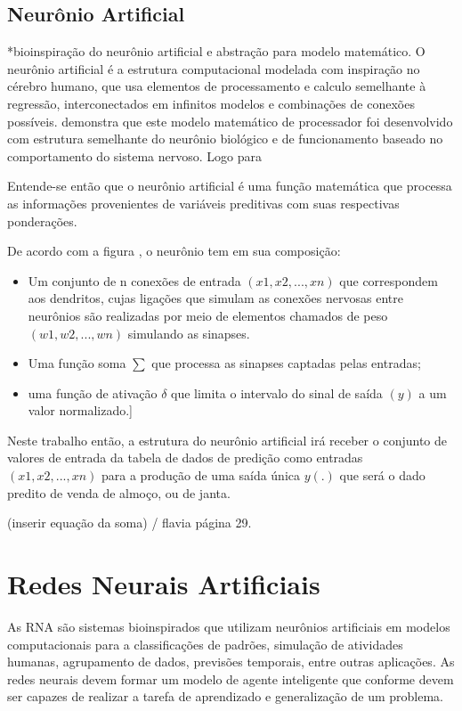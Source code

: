 \documentclass[	12pt, Times, openright, twoside, a4paper, english, brazil]{abntex2}
\begin{document}
\subsection{Neurônio Artificial}
*bioinspiração do neurônio artificial e abstração para modelo matemático.
O neurônio artificial é a estrutura computacional modelada com inspiração no cérebro humano, que usa elementos de processamento  e calculo semelhante à regressão, interconectados em infinitos modelos e combinações de conexões possíveis.
\cite{Haykin1994} demonstra que este modelo matemático de processador foi desenvolvido com estrutura semelhante do neurônio biológico e de funcionamento baseado no comportamento do sistema nervoso.
Logo para 

Entende-se então que o neurônio artificial é uma função matemática que processa as informações provenientes de variáveis preditivas com suas respectivas ponderações. 

De acordo com a figura , o neurônio tem em sua composição: 
\begin{itemize}
\item  Um conjunto de n conexões de entrada $ (x1,x2,...,xn)$ que correspondem aos dendritos, cujas ligações que simulam as conexões nervosas entre neurônios são realizadas por meio de elementos chamados de peso $(w1,w2,...,wn)$ simulando as sinapses.
\item Uma função soma $\sum $ que processa as sinapses captadas pelas entradas;
\item uma função de ativação $ \delta $ que limita o intervalo do sinal de saída $(y)$ a um valor normalizado.]
\end{itemize}

Neste trabalho então, a estrutura do neurônio artificial irá receber o conjunto de valores de entrada da tabela de dados de predição como entradas $ (x1,x2,...,xn)$ para a produção de uma saída única $ y(.)$ que será o dado predito de venda de almoço, ou de janta.

(inserir equação da soma) / flavia página 29.

\section{Redes Neurais Artificiais}
As RNA são sistemas bioinspirados que utilizam neurônios artificiais em modelos computacionais para a classificações de padrões, simulação de atividades humanas, agrupamento de dados, previsões temporais, entre outras aplicações. As redes neurais devem formar um modelo de agente inteligente que conforme \cite{Haykin1994} devem ser capazes de realizar a tarefa de aprendizado e generalização de um problema. 
\end{document}
